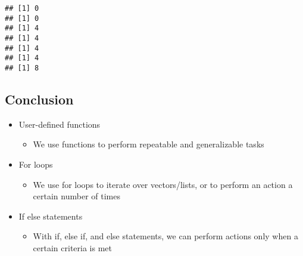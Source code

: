\documentclass[]{article}
\newenvironment{Shaded}{\begin{snugshade}}{\end{snugshade}}
\newcommand{\KeywordTok}[1]{\textcolor[rgb]{0.13,0.29,0.53}{\textbf{#1}}}
\newcommand{\DataTypeTok}[1]{\textcolor[rgb]{0.13,0.29,0.53}{#1}}
\newcommand{\DecValTok}[1]{\textcolor[rgb]{0.00,0.00,0.81}{#1}}
\newcommand{\StringTok}[1]{\textcolor[rgb]{0.31,0.60,0.02}{#1}}
\newcommand{\ControlFlowTok}[1]{\textcolor[rgb]{0.13,0.29,0.53}{\textbf{#1}}}
\newcommand{\OperatorTok}[1]{\textcolor[rgb]{0.81,0.36,0.00}{\textbf{#1}}}
\newcommand{\NormalTok}[1]{#1}
\providecommand{\tightlist}{%
  \setlength{\itemsep}{0pt}\setlength{\parskip}{0pt}}
\begin{document}
\begin{Shaded}
\end{Shaded}

\begin{verbatim}
## [1] 0
## [1] 0
## [1] 4
## [1] 4
## [1] 4
## [1] 4
## [1] 8
\end{verbatim}

\subsection{Conclusion}\label{conclusion}

\begin{itemize}
\tightlist
\item
  User-defined functions

  \begin{itemize}
  \tightlist
  \item
    We use functions to perform repeatable and generalizable tasks
  \end{itemize}
\item
  For loops

  \begin{itemize}
  \tightlist
  \item
    We use for loops to iterate over vectors/lists, or to perform an
    action a certain number of times
  \end{itemize}
\item
  If else statements

  \begin{itemize}
  \tightlist
  \item
    With if, else if, and else statements, we can perform actions only
    when a certain criteria is met
  \end{itemize}
\end{itemize}
\end{document}
